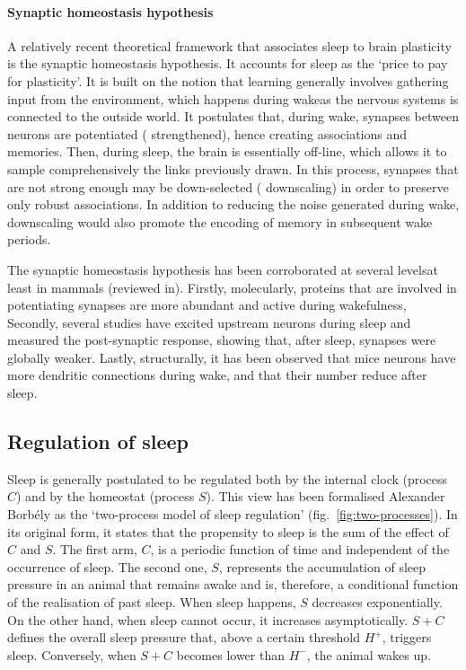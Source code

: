 \paragraph*{Synaptic homeostasis hypothesis}
A relatively recent theoretical framework that associates sleep to brain plasticity is the synaptic homeostasis hypothesis\cite{tononi_sleep_2003,tononi_sleep_2006}.
It accounts for sleep as the `price to pay for plasticity'.
It is built on the notion that learning generally involves gathering input from the environment, which happens during wake\emd{}as the nervous systems is connected to the outside world.
It postulates that, during wake, synapses between neurons are potentiated (\ie{} strengthened), hence creating associations and memories.
Then, during sleep, the brain is essentially off-line, which allows it to sample comprehensively the links previously drawn.
In this process, synapses that are not strong enough may be down-selected (\ie{} downscaling) in order to preserve only robust associations\cite{tononi_sleep_2014}.
In addition to reducing the noise generated during wake, downscaling would also promote the encoding of memory in subsequent wake periods.

The synaptic homeostasis hypothesis has been corroborated at several levels\emd{}at least in mammals (reviewed in\cite{tononi_sleep_2014}). 
Firstly, molecularly, proteins that are involved in potentiating synapses are more abundant and active during wakefulness\cite{vyazovskiy_molecular_2008,lante_removal_2011},
Secondly, several studies have excited upstream neurons during sleep and measured the post-synaptic response, showing that, after sleep, synapses were globally weaker\cite{vyazovskiy_molecular_2008,vyazovskiy_cortical_2009,liu_direct_2010}.
Lastly, structurally, it has been observed that mice neurons have more dendritic connections during wake, and that their number reduce after sleep\cite{maret_sleep_2011}.

\subsection{Regulation of sleep}
\label{sec:two-process}
Sleep is generally postulated to be regulated both by the internal clock (process $C$) 
and by the homeostat (process $S$).
This view has been formalised Alexander Borbély as the `two-process model of sleep regulation' (fig.~\ref{fig:two-processes})\cite{borbely_two_1982,achermann_two-process_2004,skeldon_mathematical_2014}.
In its original form, it states that the propensity to sleep is the sum of the effect of $C$ and $S$.
The first arm, $C$, is a periodic function of time and independent of the occurrence of sleep.
The second one, $S$, represents the accumulation of sleep pressure in an animal that remains awake and is, therefore, a conditional function of the realisation of past sleep.
When sleep happens, $S$ decreases exponentially.
On the other hand, when sleep cannot occur, it increases asymptotically.
$S+C$ defines the overall sleep pressure that, above a certain threshold $H^+$, triggers sleep.
Conversely, when $S+C$ becomes lower than $H^-$, the animal wakes up.


